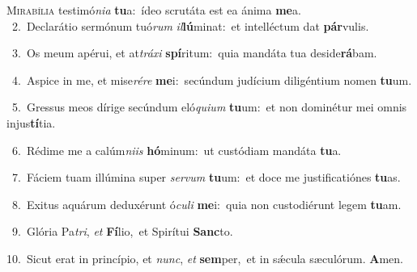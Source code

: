 \lettrine{\initial\textcolor{\initialcolor}{M}}{irabília} testimó\-\textit{ni}\-\textit{a} \textbf{tu}\-a:~\star ídeo scrutáta est ea ánima \textbf{me}\-a.\\
{\numbfont\textcolor{\numbcolor}{~2.}}~Declarátio sermónum tuó\textit{rum} \textit{il}\-\textbf{lú}minat:~\star et intelléctum dat \textbf{pár}\-vulis.\par
{\numbfont\textcolor{\numbcolor}{~3.}}~Os meum apérui, et at\-\textit{trá}\-\textit{xi} \textbf{spí}\-ritum:~\star quia mandáta tua deside\-\textbf{rá}\-bam.\par
{\numbfont\textcolor{\numbcolor}{~4.}}~Aspice in me, et mise\-\textit{ré}\-\textit{re} \textbf{me}\-i:~\star secúndum judícium diligéntium nomen \textbf{tu}\-um.\par
{\numbfont\textcolor{\numbcolor}{~5.}}~Gressus meos dírige secúndum eló\-\textit{qui}\-\textit{um} \textbf{tu}\-um:~\star et non dominétur mei omnis injus\-\textbf{tí}\-tia.\par
{\numbfont\textcolor{\numbcolor}{~6.}}~Rédime me a calúm\-\textit{ni}\-\textit{is} \textbf{hó}\-minum:~\star ut custódiam mandáta \textbf{tu}\-a.\par
{\numbfont\textcolor{\numbcolor}{~7.}}~Fáciem tuam illúmina super \textit{ser}\-\textit{vum} \textbf{tu}\-um:~\star et doce me justificatiónes \textbf{tu}\-as.\par
{\numbfont\textcolor{\numbcolor}{~8.}}~Exitus aquárum deduxérunt ó\-\textit{cu}\-\textit{li} \textbf{me}\-i:~\star quia non custodiérunt legem \textbf{tu}\-am.\par
{\numbfont\textcolor{\numbcolor}{~9.}}~Glória Pa\-\textit{tri}\-, \textit{et} \textbf{Fí}\-lio,~\star et Spirítui \textbf{Sanc}\-to.\par
{\numbfont\textcolor{\numbcolor}{10.}}~Sicut erat in princípio, et \textit{nunc}\-, \textit{et} \textbf{sem}\-per,~\star et in sǽcula sæculórum. \textbf{A}\-men.\par
